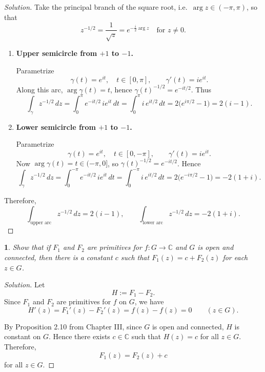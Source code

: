 \documentclass[12pt, a4paper]{report}
\theoremstyle{spaced}
\newtheorem{exercise}{}
\newcommand{\setexercise}[1]{\setcounter{exercise}{#1-1}}
\begin{document}
\begin{proof}[Solution]
	Take the principal branch of the square root, i.e.\ \(\arg z\in(-\pi,\pi)\), so that
	\[
		z^{-1/2} = \frac{1}{\sqrt{z}} = e^{-\tfrac{i}{2}\arg z}
		\quad\text{for } z\neq 0.
	\]

	\begin{enumerate}\itemsep0pt
		\item[(a)] \textbf{Upper semicircle from \(+1\) to \(-1\).}

			Parametrize
			\[
				\gamma(t) = e^{it},\quad t\in[0,\pi], \qquad \gamma'(t) = i e^{it}.
			\]
			Along this arc, \(\arg \gamma(t)=t\), hence \(\gamma(t)^{-1/2} = e^{-it/2}\). Thus
			\[
				\int_\gamma z^{-1/2}\,dz
				= \int_0^\pi e^{-it/2} \, i e^{it}\,dt
				= \int_0^\pi i\,e^{it/2}\,dt
				= 2\bigl(e^{i\pi/2}-1\bigr)
				= 2(i-1).
			\]

		\item[(b)] \textbf{Lower semicircle from \(+1\) to \(-1\).}

			Parametrize
			\[
				\gamma(t) = e^{it},\quad t\in[0,-\pi], \qquad \gamma'(t) = i e^{it}.
			\]
			Now \(\arg \gamma(t)=t \in(-\pi,0]\), so \(\gamma(t)^{-1/2} = e^{-it/2}\). Hence
			\[
				\int_\gamma z^{-1/2}\,dz
				= \int_0^{-\pi} e^{-it/2}\, i e^{it}\,dt
				= \int_0^{-\pi} i\, e^{it/2}\,dt
				= 2\bigl(e^{-i\pi/2}-1\bigr)
				= -2(1+i).
			\]
	\end{enumerate}

	Therefore,
	\[
		\int_{\text{upper arc}} z^{-1/2}\,dz = 2(i-1),\qquad
		\int_{\text{lower arc}} z^{-1/2}\,dz = -2(1+i).
	\]
\end{proof}


\setexercise{21}
\begin{exercise}
	Show that if $F_1$ and $F_2$ are primitives for $f:G\to\mathbb{C}$ and $G$ is open and connected, then there is a constant $c$ such that $F_1(z)=c+F_2(z)$ for each $z\in G$.
\end{exercise}

\begin{proof}[Solution]
	Let
	\[
		H:=F_1-F_2.
	\]
	Since \(F_1\) and \(F_2\) are primitives for \(f\) on \(G\), we have
	\[
		H'(z)=F_1'(z)-F_2'(z)=f(z)-f(z)=0
		\qquad (z\in G).
	\]

	By Proposition 2.10 from Chapter III, since \(G\) is open and connected, \(H\) is
	constant on \(G\). Hence there exists \(c\in\mathbb C\) such that
	\(
	H(z)=c
	\)
	for all \(z\in G\). Therefore,
	\[
		F_1(z)=F_2(z)+c
	\]
	for all \(z\in G\).
\end{proof}
\end{document}
